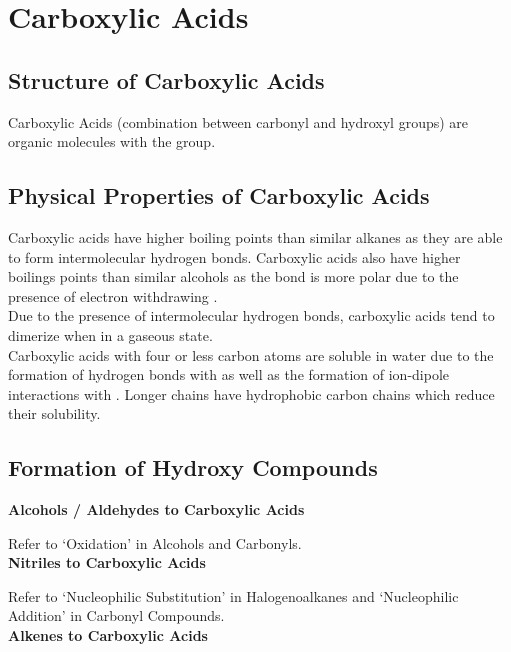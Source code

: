 \documentclass[../main]{subfiles}
\begin{document}
\section{Carboxylic Acids}

	\subsection{Structure of Carboxylic Acids}

	Carboxylic Acids (combination between carbonyl and hydroxyl groups) are organic molecules with the  group.

	\subsection{Physical Properties of Carboxylic Acids}

	Carboxylic acids have higher boiling points than similar alkanes as they are able to form intermolecular hydrogen bonds. Carboxylic acids also have higher boilings points than similar alcohols as the  bond is more polar due to the presence of electron withdrawing .\\

	Due to the presence of intermolecular hydrogen bonds, carboxylic acids tend to dimerize when in a gaseous state. \\

	Carboxylic acids with four or less carbon atoms are soluble in water due to the formation of hydrogen bonds with  as well as the formation of ion-dipole interactions with . Longer chains have hydrophobic carbon chains which reduce their solubility.

	\subsection{Formation of Hydroxy Compounds}

	\noindent \textbf{Alcohols / Aldehydes to Carboxylic Acids}

	Refer to `Oxidation' in Alcohols and Carbonyls. \\

	\noindent \textbf{Nitriles to Carboxylic Acids}

	Refer to `Nucleophilic Substitution' in Halogenoalkanes and `Nucleophilic Addition' in Carbonyl Compounds. \\ 

	\noindent \textbf{Alkenes to Carboxylic Acids}
\end{document}
